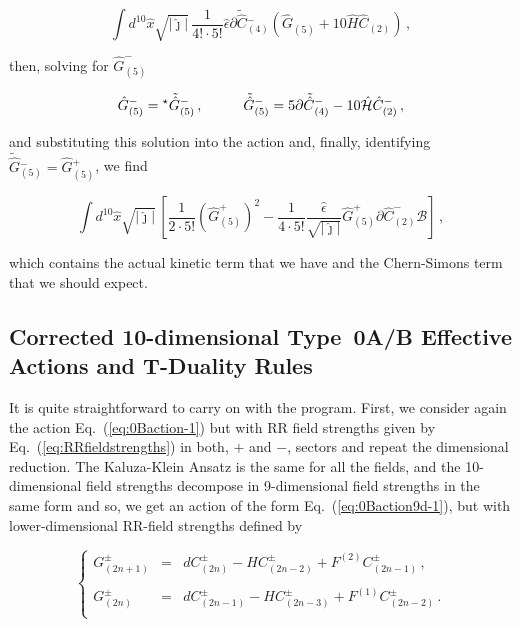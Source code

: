 \documentclass[12pt,a4paper]{article}
\begin{document}
\begin{equation}
\int d^{10}\hat{x}\sqrt{|\hat{\jmath}|}\, {\textstyle\frac{1}{4!\cdot 5!}}
\hat{\epsilon}\partial\tilde{\hat{C}}{}^{-}_{(4)}
\left(\hat{G}_{(5)} +10\hat{H}\hat{C}_{(2)}\right)\, ,
\end{equation}

\noindent then, solving for $\hat{G}^{-}_{(5)}$ 

\begin{equation}
\hat{G}^{-}_{(5)}= {}^{\star}\tilde{\hat{G}}{}^{-}_{(5)}\, ,
\hspace{1cm}
\tilde{\hat{G}}{}^{-}_{(5)} =5\partial\tilde{\hat{C}}{}^{-}_{(4)}
-10\hat{\cal H}\hat{C}^{-}_{(2)}\, ,
\end{equation}

\noindent and substituting this solution into the action and, finally,
identifying $\tilde{\hat{G}}{}^{-}_{(5)}=\hat{G}{}^{+}_{(5)}$,
we find

\begin{equation}
\label{eq:CS0B-1}
\int d^{10}\hat{x}\sqrt{|\hat{\jmath}|}\, \left[
{\textstyle\frac{1}{2\cdot 5!}}\left(\hat{G}^{+}_{(5)}\right)^{2}
-{\textstyle\frac{1}{4 \cdot5!}}\frac{\hat{\epsilon}}{\sqrt{|\hat{\jmath}|}}
\hat{G}^{+}_{(5)}\partial\hat{C}^{-}_{(2)}\mathcal{B}
\right]\, ,
\end{equation}

\noindent which contains the actual kinetic term that we have and
the Chern-Simons term that we should expect.


\subsection{Corrected 10-dimensional Type~0A/B Effective Actions
and T-Duality Rules}

It is quite straightforward to carry on with the program. First, we
consider again the action Eq.~(\ref{eq:0Baction-1}) but with RR field
strengths given by Eq.~(\ref{eq:RRfieldstrengths}) in both, $+$ and
$-$, sectors and repeat the dimensional reduction. The Kaluza-Klein
Ansatz is the same for all the fields, and the 10-dimensional field
strengths decompose in 9-dimensional field strengths in the same form
and so, we get an action of the form Eq.~(\ref{eq:0Baction9d-1}), but
with lower-dimensional RR-field strengths defined by

\begin{equation}
\label{eq:9dRRfieldstrengths0AB}
\left\{
\begin{array}{lcl}
G^{\pm}_{(2n+1)} & = & dC^{\pm}_{(2n)} -HC^{\pm}_{(2n-2)} 
+F^{(2)} C^{\pm}_{(2n-1)}\, ,\\
& & \\
G^{\pm}_{(2n)} & = & dC^{\pm}_{(2n-1)} -HC^{\pm}_{(2n-3)} 
+F^{(1)} C^{\pm}_{(2n-2)}\, .\\
\end{array}
\right.
\end{equation}
\end{document}
